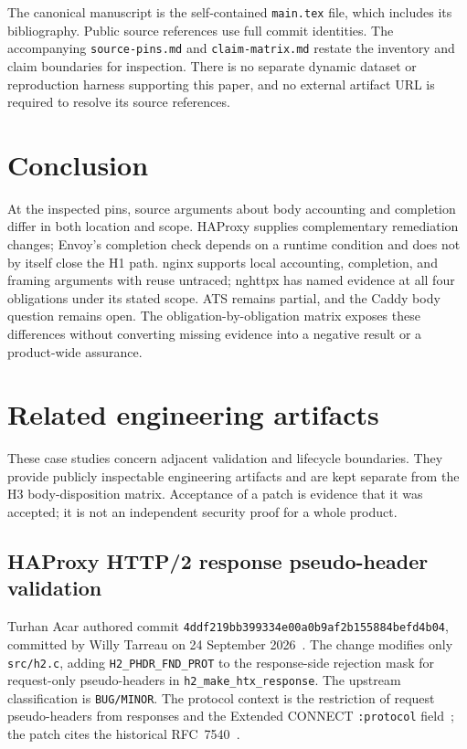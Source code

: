 \documentclass[11pt,letterpaper]{article}
\newcommand{\code}[1]{\nolinkurl{#1}}
\begin{document}
The canonical manuscript is the self-contained \code{main.tex} file, which includes its bibliography. Public source references use full commit identities. The accompanying \code{source-pins.md} and \code{claim-matrix.md} restate the inventory and claim boundaries for inspection. There is no separate dynamic dataset or reproduction harness supporting this paper, and no external artifact URL is required to resolve its source references.

\section{Conclusion}
At the inspected pins, source arguments about body accounting and completion differ in both location and scope. HAProxy supplies complementary remediation changes; Envoy's completion check depends on a runtime condition and does not by itself close the H1 path. nginx supports local accounting, completion, and framing arguments with reuse untraced; nghttpx has named evidence at all four obligations under its stated scope. ATS remains partial, and the Caddy body question remains open. The obligation-by-obligation matrix exposes these differences without converting missing evidence into a negative result or a product-wide assurance.

\appendix
\section{Related engineering artifacts}\label{sec:correctness}
These case studies concern adjacent validation and lifecycle boundaries. They provide publicly inspectable engineering artifacts and are kept separate from the H3 body-disposition matrix. Acceptance of a patch is evidence that it was accepted; it is not an independent security proof for a whole product.

\subsection{HAProxy HTTP/2 response pseudo-header validation}
Turhan Acar authored commit \code{4ddf219bb399334e00a0b9af2b155884befd4b04}, committed by Willy Tarreau on 24 September 2026~\cite{hapcorrectness}. The change modifies only \code{src/h2.c}, adding \code{H2_PHDR_FND_PROT} to the response-side rejection mask for request-only pseudo-headers in \code{h2_make_htx_response}. The upstream classification is \code{BUG/MINOR}. The protocol context is the restriction of request pseudo-headers from responses and the Extended CONNECT \code{:protocol} field~\cite{rfc9113,rfc8441}; the patch cites the historical RFC~7540~\cite{rfc7540}.
\end{document}

